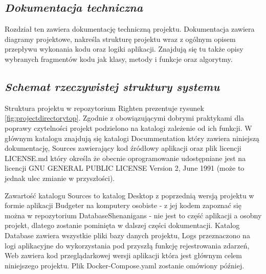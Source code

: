 \documentclass[a4paper,10pt, twoside]{report}
\newcommand{\customstylechapter}[1]{\large{\textit{#1}}}
\newcommand{\customstylesection}[1]{\textbf{\textit{#1}}}
\begin{document}
\begin{large}
\chapter{\customstylechapter{Dokumentacja techniczna}}
{Rozdział ten zawiera dokumentację techniczną projektu. Dokumentacja zawiera 
diagramy projektowe, nakreśla strukturę projektu wraz z ogólnym opisem przepływu
 wykonania kodu oraz logiki aplikacji. Znajdują się tu także opisy wybranych 
fragmentów kodu jak klasy, metody i funkcje oraz algorytmy.}



\section{\customstylesection{Schemat rzeczywistej struktury systemu}}
{Struktura projektu w repozytorium Righten \cite{GITRighten} prezentuje rysunek 
\ref*{fig:projectdirectorytop}. Zgodnie z obowiązującymi dobrymi praktykami dla 
poprawy czytelności projekt podzielono na katalogi zależenie od ich funkcji. W 
głównym katalogu znajdują się katalogi Docummentation który zawiera niniejszą 
dokumentację, Sources zawierający kod źródłowy aplikacji oraz plik licencji 
LICENSE.md który określa że obecnie oprogramowanie udostępniane jest na licencji
 GNU GENERAL PUBLIC LICENSE Version 2, June 1991 (może to jednak ulec zmianie w 
przyszłości).}

{Zawartość katalogu Sources to katalog Desktop z poprzednią wersją projektu w 
formie aplikacji Budgeter na komputery osobiste - z jej kodem zapoznać się można w 
repozytorium DatabaseShenanigans \cite{GITBudgeterApp} - nie jest to część 
aplikacji a osobny projekt, dlatego zostanie pominięta w dalszej części 
dokumentacji. Katalog Database zawiera wszystkie pliki bazy danych projektu, 
Logs przeznaczono na logi aplikacyjne do wykorzystania pod przyszłą funkcję 
rejestrowania zdarzeń, Web zawiera kod przeglądarkowej wersji aplikacji która 
jest głównym celem niniejszego projektu. Plik Docker-Compose.yaml zostanie 
omówiony później.}


\end{large}
\end{document}

